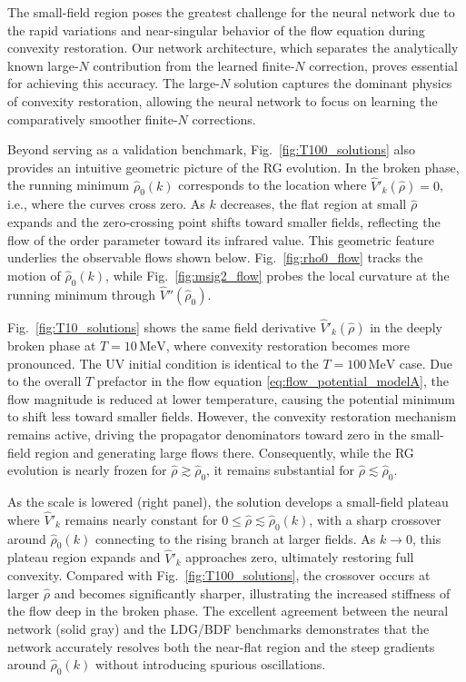 \documentclass[reprint,twocolumn,superscriptaddress,preprintnumbers,amsmath,amssymb,aps,prd,floatfix]{revtex4-2}
\def\Fig#1{Fig.~\ref{#1}}
\begin{document}
The small-field region poses the greatest challenge for the neural network due to the rapid variations and near-singular behavior of the flow equation during convexity restoration. Our network architecture, which separates the analytically known large-$N$ contribution from the learned finite-$N$ correction, proves essential for achieving this accuracy. The large-$N$ solution captures the dominant physics of convexity restoration, allowing the neural network to focus on learning the comparatively smoother finite-$N$ corrections.

Beyond serving as a validation benchmark, \Fig{fig:T100_solutions} also provides an intuitive geometric picture of the RG evolution. In the broken phase, the running minimum $\hat{\rho}_0(k)$ corresponds to the location where $\hat{V}'_k(\hat{\rho})=0$, i.e., where the curves cross zero. As $k$ decreases, the flat region at small $\hat{\rho}$ expands and the zero-crossing point shifts toward smaller fields, reflecting the flow of the order parameter toward its infrared value. This geometric feature underlies the observable flows shown below. \Fig{fig:rho0_flow} tracks the motion of $\hat{\rho}_0(k)$, while \Fig{fig:msig2_flow} probes the local curvature at the running minimum through $\hat{V}''(\hat{\rho}_0)$.

\Fig{fig:T10_solutions} shows the same field derivative $\hat{V}'_k(\hat{\rho})$ in the deeply broken phase at $T=10\,\mathrm{MeV}$, where convexity restoration becomes more pronounced. The UV initial condition is identical to the $T=100\,\mathrm{MeV}$ case. Due to the overall $T$ prefactor in the flow equation \eqref{eq:flow_potential_modelA}, the flow magnitude is reduced at lower temperature, causing the potential minimum to shift less toward smaller fields. However, the convexity restoration mechanism remains active, driving the propagator denominators toward zero in the small-field region and generating large flows there. Consequently, while the RG evolution is nearly frozen for $\hat{\rho}\gtrsim \hat{\rho}_0$, it remains substantial for $\hat{\rho}\lesssim \hat{\rho}_0$.

As the scale is lowered (right panel), the solution develops a small-field plateau where $\hat{V}'_k$ remains nearly constant for $0\le \hat{\rho}\lesssim \hat{\rho}_0(k)$, with a sharp crossover around $\hat{\rho}_0(k)$ connecting to the rising branch at larger fields. As $k\to 0$, this plateau region expands and $\hat{V}'_k$ approaches zero, ultimately restoring full convexity. Compared with \Fig{fig:T100_solutions}, the crossover occurs at larger $\hat{\rho}$ and becomes significantly sharper, illustrating the increased stiffness of the flow deep in the broken phase. The excellent agreement between the neural network (solid gray) and the LDG/BDF benchmarks demonstrates that the network accurately resolves both the near-flat region and the steep gradients around $\hat{\rho}_0(k)$ without introducing spurious oscillations.
\end{document}
